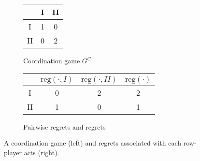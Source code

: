 \documentclass[fleqn,reqno,11pt]{article}
\begin{document}
\begin{figure}

  \begin{subfigure}[b]{0.3\textwidth}
    \centering
    \begin{tabular}{ccc}
      \toprule
      & I & II \\
      \midrule
      I & 1 & 0 \\
      II & 0 & 2\\
      \bottomrule
    \end{tabular}
    \caption{Coordination game $G^C$}
    \label{coordgame1}
  \end{subfigure}
  \hspace{1cm}
  \begin{subfigure}[b]{0.5\textwidth}
    \centering
    \begin{tabular}{cccc}
      \toprule
      & $\text{reg}( \cdot, I)$ & $\text{reg}(\cdot, II)$ & $\text{reg}(\cdot)$ \\
      \midrule
      I  & 0 & 2 & 2 \\ 
      II & 1 & 0 & 1\\
      \bottomrule
    \end{tabular}
    \caption{Pairwise regrets and regrets}
    \label{coordgame1reg}
  \end{subfigure}
  \caption{A coordination game (left) and regrets associated with each row-player acts (right).}
    \label{coordgame1mainFig}
\end{figure}
\end{document}
